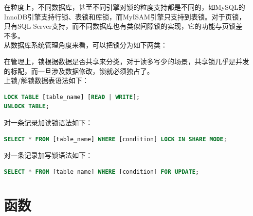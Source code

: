 \documentclass[12pt, openany, oneside]{book}
\begin{document}
在粒度上，不同数据库，甚至不同引擎对锁的粒度支持都是不同的，如MySQL的InnoDB引擎支持行锁、表锁和库锁，而MyISAM引擎只支持到表锁。对于页锁，只有SQL Server支持，而不同数据库也有类似间隙锁的实现，它的功能与页锁差不多。\\

从数据库系统管理角度来看，可以把锁分为如下两类：

\begin{table}[H]
	\centering
	\caption{锁的管理分类}
\end{table}

在管理上，锁根据数据是否共享来分类，对于读多写少的场景，共享锁几乎是并发的标配，而一旦涉及数据修改，锁就必须独占了。\\

上锁/解锁数据表语法如下：

\vspace{-0.5cm}

\begin{lstlisting}[language=SQL]
LOCK TABLE [table_name] [READ | WRITE];
UNLOCK TABLE;
\end{lstlisting}

对一条记录加读锁语法如下：

\vspace{-0.5cm}

\begin{lstlisting}[language=SQL]
SELECT * FROM [table_name] WHERE [condition] LOCK IN SHARE MODE;
\end{lstlisting}

对一条记录加写锁语法如下：

\vspace{-0.5cm}

\begin{lstlisting}[language=SQL]
SELECT * FROM [table_name] WHERE [condition] FOR UPDATE;
\end{lstlisting}

\newpage

\chapter{函数}
\end{document}
